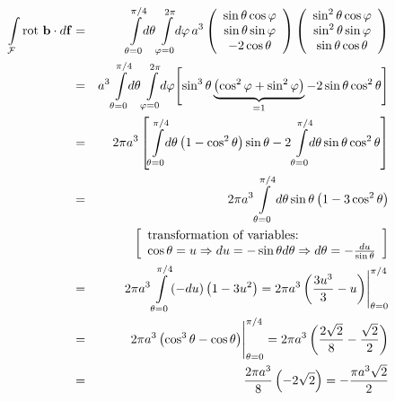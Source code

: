 {\begin{enumerate}
\begin{eqnarray*}
  \int \limits_{\cal F} \textrm{rot } {\bf b} \cdot d{\bf f} & = &
  \int \limits_{\theta=0}^{\pi/4} \!\! d\theta
  \int \limits_{\varphi=0}^{2 \pi} \!\! d\varphi \, a^3
  \left(
    \begin{array}{c}
      \sin \theta \cos \varphi \\
      \sin \theta \sin \varphi \\
      -2\cos \theta
    \end{array}
  \right)
  \left(
    \begin{array}{c}
      \sin^2 \theta \cos \varphi \\
      \sin^2 \theta \sin \varphi \\
      \sin \theta \cos \theta
    \end{array}
  \right)  \\
  & = & a^3
  \int \limits_{\theta=0}^{\pi/4} \!\! d\theta
  \int \limits_{\varphi=0}^{2 \pi} \!\! d\varphi
  \Biggl[
    \sin^3\theta
    \underbrace{\left(\cos^2\varphi+\sin^2\varphi\right)}_{=1}-
      2\sin\theta\cos^2\theta
  \Biggr]   \\
  & = & 2 \pi a^3
  \left[
    \int \limits_{\theta=0}^{\pi/4} \!\! d\theta
    \left(1-\cos^2\theta\right)\sin\theta-
    2\int \limits_{\theta=0}^{\pi/4} \!\! d\theta
    \sin \theta \cos^2 \theta
  \right]   \\
  & = & 2 \pi a^3
  \int \limits_{\theta=0}^{\pi/4}d\theta
  \sin \theta \left(1-3\cos^2\theta\right)   \\
  &&   \left[
    \begin{array}{l}
      \mbox{transformation of variables: } \\
      \cos \theta = u \Rightarrow du=-\sin \theta d\theta
      \Rightarrow d\theta=-\frac{du}{\sin \theta}
    \end{array}
  \right] \\
  & = & 2 \pi a^3
  \int \limits_{\theta=0}^{\pi/4}(-du)\left(1-3u^2\right)=
    2 \pi a^3
    \left( \frac{3u^3}{3}-u \right)\Biggr|_{\theta=0}^{\pi/4}  \\
  & = & 2 \pi a^3
    \left(\cos^3\theta-\cos\theta \right)\Biggr|_{\theta=0}^{\pi/4}=
    2 \pi a^3
    \left(\frac{2\sqrt{2}}{8}-\frac{\sqrt{2}}{2} \right)   \\
  & = & \frac{2 \pi a^3}{8}\left(-2\sqrt{2}\right)=
    -\frac{\pi a^3 \sqrt{2}}{2}
\end{eqnarray*}



\end{enumerate}}
